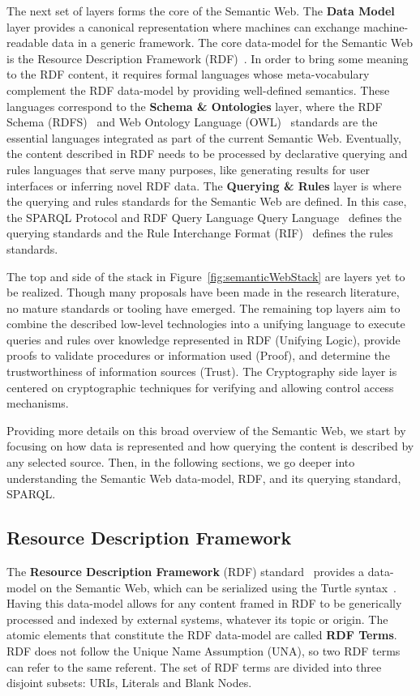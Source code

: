 The next set of layers forms the core of the Semantic Web. The \textbf{Data Model} layer 
provides a canonical representation where machines can exchange machine-readable data in 
a generic framework. The core data-model for the Semantic Web is the Resource Description 
Framework (RDF)~\cite{key:rdfprimer}. In order to bring some meaning to the RDF content, 
it requires formal languages whose meta-vocabulary complement the RDF data-model by providing 
well-defined semantics. These languages correspond to the \textbf{Schema \& Ontologies} layer, 
where the RDF Schema (RDFS)~\cite{key:oldrdf} and Web Ontology Language (OWL)~\cite{key:owloverview, key:owl2rationale} 
standards are the essential languages integrated as part of the current Semantic Web. 
Eventually, the content described in RDF needs to be processed by declarative querying 
and rules languages that serve many purposes, like generating results for user interfaces 
or inferring novel RDF data. The \textbf{Querying \& Rules} layer is where the querying 
and rules standards for the Semantic Web are defined. In this case, the SPARQL Protocol 
and RDF Query Language Query Language~\cite{key:sparql,key:sparql11protocol,key:sparql11} 
defines the querying standards and the Rule Interchange Format (RIF)~\cite{key:rifframework} 
defines the rules standards.

The top and side of the stack in Figure~\ref{fig:semanticWebStack} are layers yet to be realized. Though many 
proposals have been made in the research literature, no mature standards or tooling have 
emerged. The remaining top layers aim to combine the described low-level technologies into 
a unifying language to execute queries and rules over knowledge represented in RDF 
(Unifying Logic), provide proofs to validate procedures or information used (Proof), and 
determine the trustworthiness of information sources (Trust). The Cryptography side layer 
is centered on cryptographic techniques for verifying and allowing control access mechanisms.

Providing more details on this broad overview of the Semantic Web, we start by focusing on 
how data is represented and how querying the content is described by any selected source. 
Then, in the following sections, we go deeper into understanding the Semantic Web data-model, 
RDF, and its querying standard, SPARQL.

\subsection{Resource Description Framework}
\label{cap2:semWeb/rdf}
The \textbf{Resource Description Framework} (RDF) standard~\cite{key:rdfprimer} provides 
a data-model on the Semantic Web, which can be serialized using the Turtle syntax~\cite{key:turtle}. 
Having this data-model allows for any content framed in RDF to be generically processed 
and indexed by external systems, whatever its topic or origin. The atomic elements that 
constitute the RDF data-model are called \textbf{RDF Terms}. RDF does not follow the Unique 
Name Assumption (UNA), so two RDF terms can refer to the same referent. The set of RDF terms 
are divided into three disjoint subsets: URIs, Literals and Blank Nodes.

